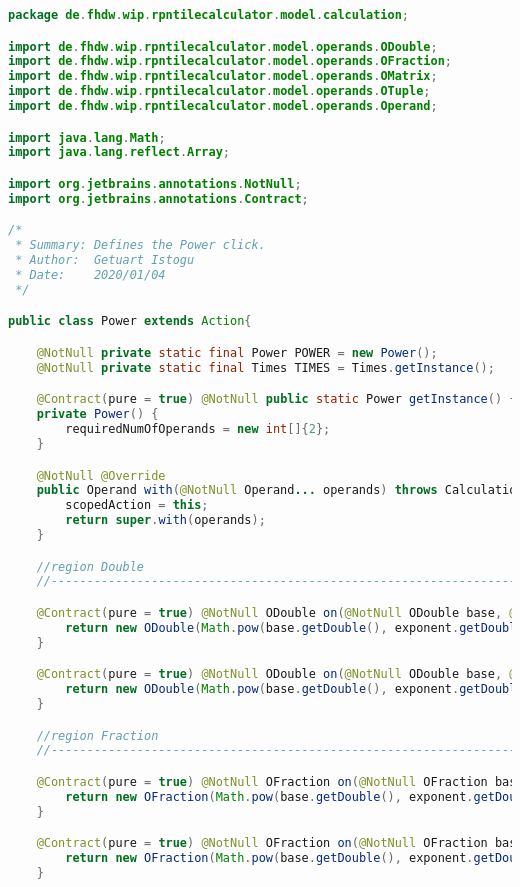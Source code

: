 \begin{lstlisting}[caption=Power (Istogu),label=list:Power,language=Java]
package de.fhdw.wip.rpntilecalculator.model.calculation;

import de.fhdw.wip.rpntilecalculator.model.operands.ODouble;
import de.fhdw.wip.rpntilecalculator.model.operands.OFraction;
import de.fhdw.wip.rpntilecalculator.model.operands.OMatrix;
import de.fhdw.wip.rpntilecalculator.model.operands.OTuple;
import de.fhdw.wip.rpntilecalculator.model.operands.Operand;

import java.lang.Math;
import java.lang.reflect.Array;

import org.jetbrains.annotations.NotNull;
import org.jetbrains.annotations.Contract;

/*
 * Summary: Defines the Power click.
 * Author:  Getuart Istogu
 * Date:    2020/01/04
 */

public class Power extends Action{

    @NotNull private static final Power POWER = new Power();
    @NotNull private static final Times TIMES = Times.getInstance();

    @Contract(pure = true) @NotNull public static Power getInstance() { return POWER; }
    private Power() {
        requiredNumOfOperands = new int[]{2};
    }

    @NotNull @Override
    public Operand with(@NotNull Operand... operands) throws CalculationException {
        scopedAction = this;
        return super.with(operands);
    }

    //region Double
    //------------------------------------------------------------------------------------

    @Contract(pure = true) @NotNull ODouble on(@NotNull ODouble base, @NotNull ODouble exponent) {
        return new ODouble(Math.pow(base.getDouble(), exponent.getDouble()));
    }

    @Contract(pure = true) @NotNull ODouble on(@NotNull ODouble base, @NotNull OFraction exponent) {
        return new ODouble(Math.pow(base.getDouble(), exponent.getDouble()));
    }

    //region Fraction
    //------------------------------------------------------------------------------------

    @Contract(pure = true) @NotNull OFraction on(@NotNull OFraction base, @NotNull ODouble exponent){
        return new OFraction(Math.pow(base.getDouble(), exponent.getDouble()));
    }

    @Contract(pure = true) @NotNull OFraction on(@NotNull OFraction base, @NotNull OFraction exponent){
        return new OFraction(Math.pow(base.getDouble(), exponent.getDouble()));
    }


\end{lstlisting}
